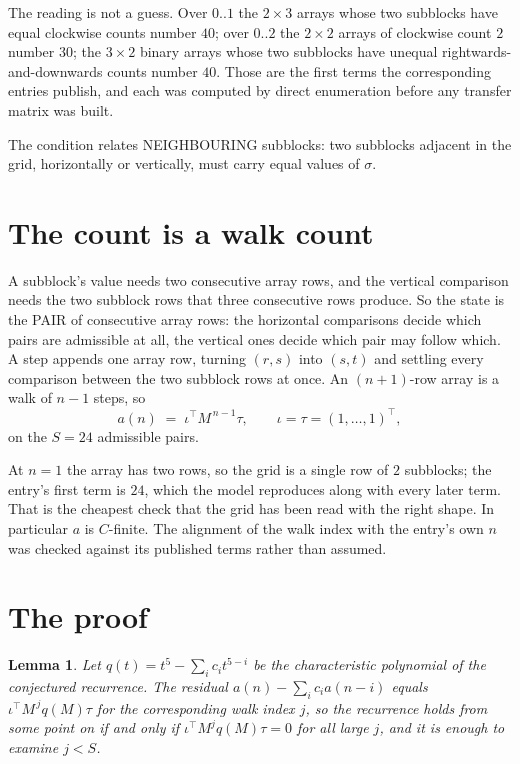 \documentclass[11pt,a4paper]{article}
\theoremstyle{plain}
\newtheorem{lemma}[theorem]{Lemma}
\theoremstyle{definition}
\begin{document}
The reading is not a guess. Over $0..1$ the $2\times3$ arrays whose two subblocks have equal
clockwise counts number $40$; over $0..2$ the $2\times2$ arrays of clockwise count $2$ number
$30$; the $3\times2$ binary arrays whose two subblocks have unequal rightwards-and-downwards
counts number $40$. Those are the first terms the corresponding entries publish, and each was
computed by direct enumeration before any transfer matrix was built.

The condition relates NEIGHBOURING subblocks: two subblocks adjacent in the grid, horizontally
or vertically, must carry equal values of $\sigma$.

\section{The count is a walk count}

A subblock's value needs two consecutive array rows, and the vertical
comparison needs the two subblock rows that three consecutive rows produce. So the state is the
PAIR of consecutive array rows: the horizontal comparisons decide which pairs are admissible at
all, the vertical ones decide which pair may follow which. A step appends one array row,
turning $(r,s)$ into $(s,t)$ and settling every comparison between the two subblock rows at
once. An $(n+1)$-row array is a walk of $n-1$ steps, so
\[
a(n)\;=\;\iota^{\!\top}M^{\,n-1}\tau,\qquad\iota=\tau=(1,\dots,1)^{\!\top},
\]
on the $S=24$ admissible pairs.

At $n=1$ the array has two rows, so the grid is a single row of $2$
subblocks; the entry's first term is $24$, which the model
reproduces along with every later term. That is the cheapest check that the grid has been read
with the right shape.
In particular $a$ is $C$-finite. The alignment of the walk index with the entry's own $n$ was
checked against its published terms rather than assumed.

\section{The proof}

\begin{lemma}\label{lem:crit}
Let $q(t)=t^{5}-\sum_i c_it^{5-i}$ be the characteristic polynomial of the
conjectured recurrence. The residual $a(n)-\sum_ic_ia(n-i)$ equals
$\iota^{\!\top}M^{\,j}q(M)\tau$ for the corresponding walk index $j$, so the recurrence
holds from some point on if and only if $\iota^{\!\top}M^{j}q(M)\tau=0$ for all large $j$,
and it is enough to examine $j<S$.
\end{lemma}
\end{document}
